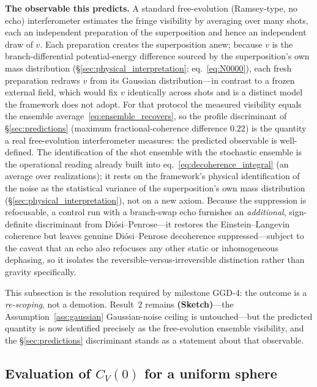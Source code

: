 \documentclass[12pt,a4paper]{article}
\theoremstyle{remark}
\begin{document}
\textbf{The observable this predicts.} A standard free-evolution (Ramsey-type, no echo)
interferometer estimates the fringe visibility by averaging over many shots, each an
independent preparation of the superposition and hence an independent draw of $v$. Each
preparation creates the superposition anew; because $v$ is the branch-differential
potential-energy difference sourced by the superposition's own mass distribution
(\S\ref{sec:physical_interpretation}; eq.~\eqref{eq:N0000}), each fresh preparation
redraws $v$ from its Gaussian distribution---in contrast to a frozen external field, which
would fix $v$ identically across shots and is a distinct model the framework does not
adopt. For that protocol the measured visibility equals the ensemble
average~\eqref{eq:ensemble_recovers}, so the profile discriminant of
\S\ref{sec:predictions} (maximum fractional-coherence difference $0.22$) is the quantity a
real free-evolution interferometer measures: the predicted observable is well-defined. The
identification of the shot ensemble with the stochastic ensemble is the operational reading
already built into eq.~\eqref{eq:decoherence_integral} (an average over realizations); it
rests on the framework's physical identification of the noise as the statistical variance of
the superposition's own mass distribution (\S\ref{sec:physical_interpretation}), not on a
new axiom. Because the suppression is refocusable, a control
run with a branch-swap echo furnishes an \emph{additional}, sign-definite discriminant from
Di\'osi--Penrose---it restores the Einstein--Langevin coherence but leaves genuine
Di\'osi--Penrose decoherence suppressed---subject to the caveat that an echo also refocuses
any other static or inhomogeneous dephasing, so it isolates the reversible-versus-irreversible
distinction rather than gravity specifically.

This subsection is the resolution required by milestone GGD-4: the outcome is a
\emph{re-scoping}, not a demotion. Result~2 remains \textbf{(Sketch)}---the
Assumption~\ref{ass:gaussian} Gaussian-noise ceiling is untouched---but the predicted
quantity is now identified precisely as the free-evolution ensemble visibility, and the
\S\ref{sec:predictions} discriminant stands as a statement about that observable.

\subsection{Evaluation of $C_V(0)$ for a uniform sphere}
\end{document}
